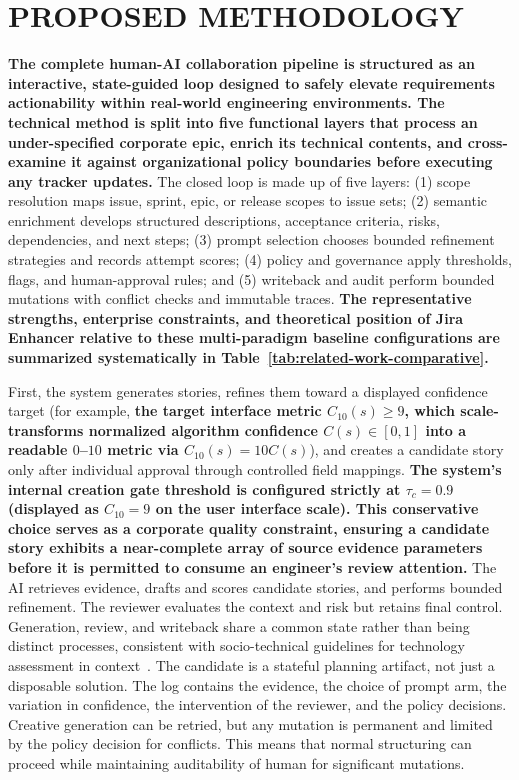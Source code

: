 \documentclass[manuscript,review]{acmart}
\begin{document}
\section{PROPOSED METHODOLOGY}
\textbf{The complete human-AI collaboration pipeline is structured as an interactive, state-guided loop designed to safely elevate requirements actionability within real-world engineering environments. The technical method is split into five functional layers that process an under-specified corporate epic, enrich its technical contents, and cross-examine it against organizational policy boundaries before executing any tracker updates.} The closed loop is made up of five layers: (1) scope resolution maps issue, sprint, epic, or release scopes to issue sets; (2) semantic enrichment develops structured descriptions, acceptance criteria, risks, dependencies, and next steps; (3) prompt selection chooses bounded refinement strategies and records attempt scores; (4) policy and governance apply thresholds, flags, and human-approval rules; and (5) writeback and audit perform bounded mutations with conflict checks and immutable traces. \textbf{The representative strengths, enterprise constraints, and theoretical position of Jira Enhancer relative to these multi-paradigm baseline configurations are summarized systematically in Table~\ref{tab:related-work-comparative}.}

First, the system generates stories, refines them toward a displayed confidence target (for example, \textbf{the target interface metric $C_{10}(s) \geq 9$, which scale-transforms normalized algorithm confidence $C(s) \in [0, 1]$ into a readable $0$--$10$ metric via $C_{10}(s) = 10C(s)$}), and creates a candidate story only after individual approval through controlled field mappings. \textbf{The system's internal creation gate threshold is configured strictly at $\tau_c = 0.9$ (displayed as $C_{10} = 9$ on the user interface scale). This conservative choice serves as a corporate quality constraint, ensuring a candidate story exhibits a near-complete array of source evidence parameters before it is permitted to consume an engineer's review attention.} The AI retrieves evidence, drafts and scores candidate stories, and performs bounded refinement. The reviewer evaluates the context and risk but retains final control. Generation, review, and writeback share a common state rather than being distinct processes, consistent with socio-technical guidelines for technology assessment in context~\cite{R71,R58}. The candidate is a stateful planning artifact, not just a disposable solution. The log contains the evidence, the choice of prompt arm, the variation in confidence, the intervention of the reviewer, and the policy decisions. Creative generation can be retried, but any mutation is permanent and limited by the policy decision for conflicts. This means that normal structuring can proceed while maintaining auditability of human for significant mutations.
\end{document}
